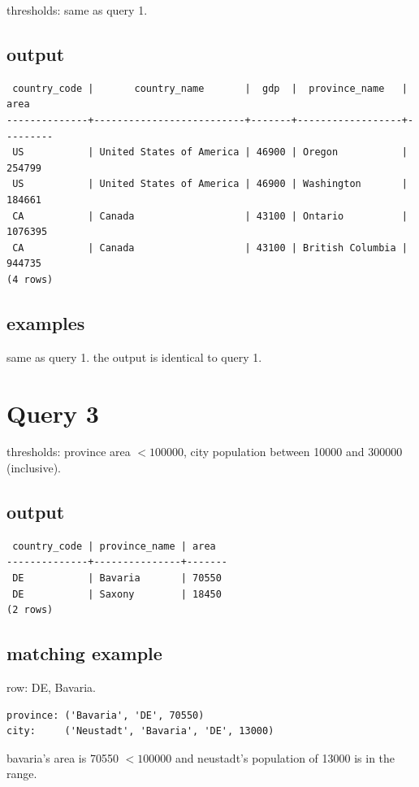 \documentclass[11pt]{article}
\begin{document}
thresholds: same as query 1.

\subsection*{output}
{\small
\begin{verbatim}
 country_code |       country_name       |  gdp  |  province_name   |  area
--------------+--------------------------+-------+------------------+---------
 US           | United States of America | 46900 | Oregon           |  254799
 US           | United States of America | 46900 | Washington       |  184661
 CA           | Canada                   | 43100 | Ontario          | 1076395
 CA           | Canada                   | 43100 | British Columbia |  944735
(4 rows)
\end{verbatim}
}

\subsection*{examples}
same as query 1. the output is identical to query 1.

\section*{Query 3}

thresholds: province area $< 100000$, city population between 10000 and 300000 (inclusive).

\subsection*{output}
{\small
\begin{verbatim}
 country_code | province_name | area
--------------+---------------+-------
 DE           | Bavaria       | 70550
 DE           | Saxony        | 18450
(2 rows)
\end{verbatim}
}

\subsection*{matching example}
row: DE, Bavaria.
\begin{verbatim}
province: ('Bavaria', 'DE', 70550)
city:     ('Neustadt', 'Bavaria', 'DE', 13000)
\end{verbatim}
bavaria's area is 70550 $< 100000$ and neustadt's population of 13000 is in the range.
\end{document}
